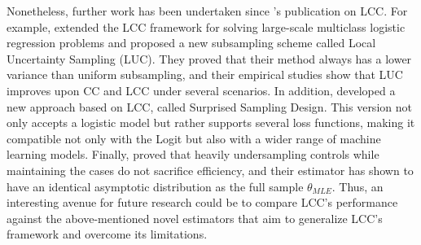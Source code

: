 Nonetheless, further work has been undertaken since \textcite{hastie2014}'s publication on LCC. For example, \textcite{han2020local} extended the LCC framework for solving large-scale multiclass logistic regression problems and proposed a new subsampling scheme called Local Uncertainty Sampling (LUC). They proved that their method always has a lower variance than uniform subsampling, and their empirical studies show that LUC improves upon CC and LCC under several scenarios. In addition, \cite{shen2021surprise} developed a new approach based on LCC, called Surprised Sampling Design. This version not only accepts a logistic model but rather supports several loss functions, making it compatible not only with the Logit but also with a wider range of machine learning models. Finally, \textcite{wang2020rare} proved that heavily undersampling controls while maintaining the cases do not sacrifice efficiency, and their estimator has shown to have an identical asymptotic distribution as the full sample $\theta_{MLE}$. Thus, an interesting avenue for future research could be to compare LCC's performance against the above-mentioned novel estimators that aim to generalize LCC's framework and overcome its limitations.



